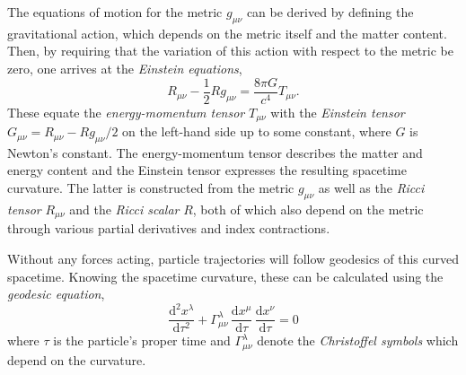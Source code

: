 The equations of motion for the metric $g_{\mu\nu}$ can be derived by defining the gravitational action, which depends on the metric itself and the matter content. Then, by requiring that the variation of this action with respect to the metric be zero, one arrives at the \emph{Einstein equations},
\begin{equation}
	\label{eq:gravitational_waves:einstein_eqs}
	R_{\mu\nu} - \frac{1}{2}Rg_{\mu\nu} = \frac{8\pi G}{c^4}T_{\mu\nu}.
\end{equation}
These equate the \emph{energy-momentum tensor} $T_{\mu\nu}$ with the \emph{Einstein tensor} $G_{\mu\nu} = R_{\mu\nu} - Rg_{\mu\nu}/2$ on the left-hand side up to some constant, where $G$ is Newton's constant. The energy-momentum tensor describes the matter and energy content and the Einstein tensor expresses the resulting spacetime curvature. The latter is constructed from the metric $g_{\mu\nu}$ as well as the \emph{Ricci tensor} $R_{\mu\nu}$ and the \emph{Ricci scalar} $R$, both of which also depend on the metric through various partial derivatives and index contractions. 

Without any forces acting, particle trajectories will follow geodesics of this curved spacetime.
Knowing the spacetime curvature, these can be calculated using the \emph{geodesic equation},
\begin{equation}
	\label{eq:gravitational_waves:geodesic_eq}
	\frac{\mathrm{d}^2x^\lambda}{\mathrm{d}\tau^2} 
	+ \Gamma^\lambda_{\mu\nu}\,
	\frac{\mathrm{d}x^\mu}{\mathrm{d}\tau}\,
	\frac{\mathrm{d}x^\nu}{\mathrm{d}\tau}
	= 0
\end{equation}
where $\tau$ is the particle's proper time and $\Gamma^\lambda_{\mu\nu}$ denote the \emph{Christoffel symbols} which depend on the curvature. 

